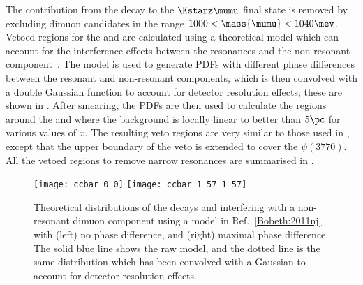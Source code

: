 The contribution from the decay \decay{\phi}{\mumu} to the $\Kstarz\mumu$ final state is removed by
excluding dimuon candidates in the range $1000<\mass{\mumu}<1040\mev$.
Vetoed regions for the \jpsi and \psitwos are calculated using a theoretical
model which can account for the interference effects between the
\decay{\ccbar}{\mumu} resonances and the non-resonant \mumu component~\cite{Bobeth:2011nj}.
The model is used to generate \glspl{PDF} with different phase differences between the resonant and
non-resonant components, which is then convolved with a double Gaussian function to account for
detector resolution effects; these are shown in .
After smearing, the \glspl{PDF} are then used to
calculate the regions around the \jpsi and \psitwos where the
background is locally linear to better than $5\pc$ for various values of $x$.
The resulting veto regions are very similar to those used in
, except that the upper boundary of the \psitwos veto is extended to cover
the $\psi(3770)$.
All the vetoed regions to remove narrow resonances are summarised in
.





\begin{figure}
  \begin{center}
    \texttt{[image: ccbar\_0\_0]}
    \texttt{[image: ccbar\_1\_57\_1\_57]}
    \caption[Theoretical distributions of \ccbar resonances interfering with a non-resonant
    component]
    {
      Theoretical distributions of the decays \jpsitomumu and \decay{\psitwos}{\mumu} interfering
      with a non-resonant dimuon component using a model in Ref.~\protect\ref{Bobeth:2011nj} with
      (left) no phase difference, and
      (right) maximal phase difference.
      The solid blue line shows the raw model, and the dotted line is the same distribution which
      has been convolved with a Gaussian to account for detector resolution effects.
    }
    \label{fig:db:ccbar}
  \end{center}
\end{figure}


